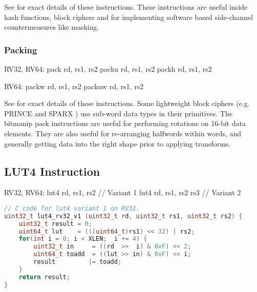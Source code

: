 See \cite[Section 2.1.3]{riscv:bitmanip:draft} for exact details of
these instructions.
These instructions are useful inside hash functions, block ciphers and
for implementing software based side-channel countermeasures like masking.


\subsubsection{Packing}

\begin{isa}
RV32, RV64: 
    pack   rd, rs1, rs2
    packu  rd, rs1, rs2
    packh  rd, rs1, rs2

RV64: 
    packw  rd, rs1, rs2
    packuw rd, rs1, rs2
\end{isa}

See \cite[Section 2.1.4]{riscv:bitmanip:draft} for exact details of
these instructions.
Some lightweight block ciphers
(e.g.
PRINCE \cite{block:prince}
and
SPARX \cite{DPUVGB:16}) use
sub-word data types in their primitives.
The bitmanip pack instructions are useful for performing rotations on
16-bit data elements.
They are also useful for re-arranging halfwords within words, and
generally getting data into the right shape prior to applying transforms.




\subsection{LUT4 Instruction}

\begin{isa}
RV32, RV64:
    lut4    rd, rs1, rs2        // Variant 1
    lut4    rd, rs1, rs2 rs3    // Variant 2
\end{isa}

\begin{lstlisting}[language=c]
// C code for lut4 variant 1 on RV32.
uint32_t lut4_rv32_v1 (uint32_t rd, uint32_t rs1, uint32_t rs2) {
    uint32_t result = 0;
    uint64_t lut    = (((uint64_t)rs1) << 32) | rs2;
    for(int i = 0; i < XLEN;  i += 4) {
        uint32_t in     = ((rd  >>  i) & 0xF) << 2;
        uint64_t toadd  = ((lut >> in) & 0xF) << i;
        result         |= toadd;
    }
    return result;
}
\end{lstlisting}


